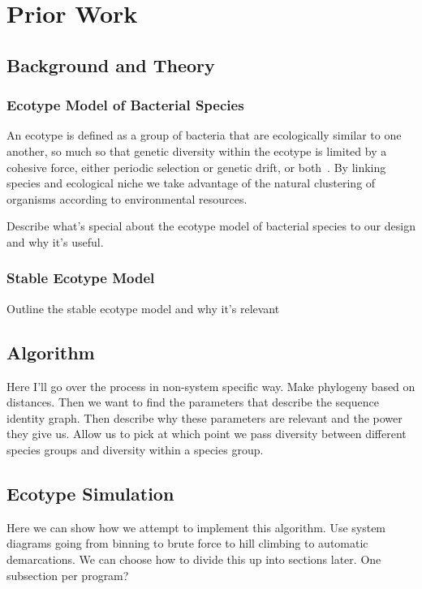 \chapter{Prior Work}
\section{Background and Theory}
\subsection{Ecotype Model of Bacterial Species}
An ecotype is defined as a group of bacteria that are ecologically similar to one another, so much so that genetic diversity within the ecotype is limited by a cohesive force, either periodic selection or genetic drift, or both~\cite{cohan2007systematics}.
By linking species and ecological niche we take advantage of the natural clustering of organisms according to environmental resources.


Describe what's special about the ecotype model of bacterial species to our design and why it's useful.
\subsection{Stable Ecotype Model}
Outline the stable ecotype model and why it's relevant
\section{Algorithm}
Here I'll go over the process in non-system specific way. Make phylogeny based on distances. Then we want to find the parameters that describe the sequence identity graph. Then describe why these parameters are relevant and the power they give us. Allow us to pick at which point we pass diversity between different species groups and diversity within a species group.
\section{Ecotype Simulation}
Here we can show how we attempt to implement this algorithm. Use system diagrams going from binning to brute force to hill climbing to automatic demarcations. We can choose how to divide this up into sections later. One subsection per program?